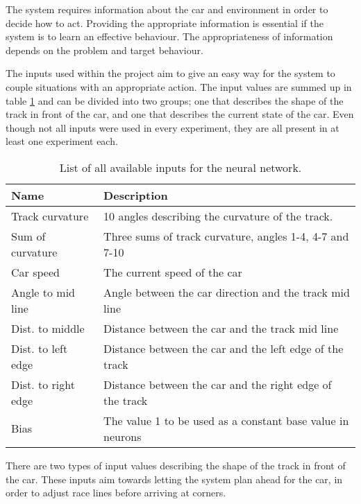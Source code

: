 The system requires information about the car and environment in order to decide how to act. Providing the appropriate information is essential if the system is to learn an effective behaviour. The appropriateness of information depends on the problem and target behaviour. 

The inputs used within the project aim to give an easy way for the system to couple situations with an appropriate action. The input values are summed up in table \ref{tab:input_table} and can be divided into two groups; one that describes the shape of the track in front of the car, and one that describes the current state of the car. Even though not all inputs were used in every experiment, they are all present in at least one experiment each.

\begin{table}[h!] 
  \centering
  \begin{tabular}{ll}
    \toprule
    Name & Description\\
    \midrule
    Track curvature & 10 angles describing the curvature of the track. \\
    Sum of curvature & Three sums of track curvature, angles 1-4, 4-7 and 7-10\\
    \midrule
    Car speed & The current speed of the car\\
    Angle to mid line & Angle between the car direction and the track mid line\\
    Dist. to middle & Distance between the car and the track mid line\\
    Dist. to left edge & Distance between the car and the left edge of the track\\
    Dist. to right edge & Distance between the car and the right edge of the track\\
    \midrule
    Bias & The value 1 to be used as a constant base value in neurons\\
    \bottomrule
  \end{tabular}
  \caption{List of all available inputs for the neural network.}
  \label{tab:input_table}
\end{table}

\noindent
There are two types of input values describing the shape of the track in front of the car. These inputs aim towards letting the system plan ahead for the car, in order to adjust race lines before arriving at corners. 

